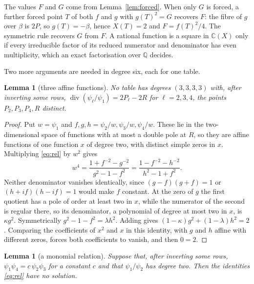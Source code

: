 \documentclass[11pt]{amsart}
\newtheorem{lemma}[theorem]{Lemma}
\theoremstyle{definition}
\newcommand{\C}{\mathbb{C}}
\newcommand{\Div}{\operatorname{div}}
\begin{document}
The values $F$ and $G$ come from Lemma~\ref{lem:forced}. When only $G$ is forced, a further forced point $T$ of both
$f$ and $g$ with $g(T)^2=G$ recovers $F$: the fibre of $g$ over $\beta$ is $2P$, so $g(T)=-\beta$, hence $X(T)=2$ and
$F=f(T)^2/4$. The symmetric rule recovers $G$ from $F$. A rational function is a square in $\C(X)$ only if every
irreducible factor of its reduced numerator and denominator has even multiplicity, which an exact factorisation over
$\mathbb Q$ decides.

Two more arguments are needed in degree six, each for one table.

\begin{lemma}[three affine functions]\label{lem:affine}
No table has degrees $(3,3,3,3)$ with, after inverting some rows, $\Div(\psi_\ell/\psi_1)=2P_\ell-2R$ for
$\ell=2,3,4$, the points $P_2,P_3,P_4,R$ distinct.
\end{lemma}

\begin{proof}
Put $w=\psi_1$ and $f,g,h=\psi_2/w,\psi_3/w,\psi_4/w$. These lie in the two-dimensional space of functions with at
most a double pole at $R$, so they are affine functions of one function $x$ of degree two, with distinct simple zeros
in $x$. Multiplying \eqref{eq:rel} by $w^2$ gives
\[
w^4=\frac{1+f^{-2}-g^{-2}}{g^2-1-f^2}=\frac{1-f^{-2}-h^{-2}}{h^2-1+f^2}.
\]
Neither denominator vanishes identically, since $(g-f)(g+f)=1$ or $(h+if)(h-if)=1$ would make $f$ constant. At the
zero of $g$ the first quotient has a pole of order at least two in $x$, while the numerator of the second is regular
there, so its denominator, a polynomial of degree at most two in $x$, is $\kappa g^2$. Symmetrically
$g^2-1-f^2=\lambda h^2$. Adding gives $(1-\kappa)g^2+(1-\lambda)h^2=2$. Comparing the coefficients of $x^2$ and $x$
in this identity, with $g$ and $h$ affine with different zeros, forces both coefficients to vanish, and then $0=2$.
\end{proof}

\begin{lemma}[a monomial relation]\label{lem:mono}
Suppose that, after inverting some rows, $\psi_1\psi_4=c\,\psi_2\psi_3$ for a constant $c$ and that
$\psi_1/\psi_2$ has degree two. Then the identities \eqref{eq:rel} have no solution.
\end{lemma}
\end{document}
